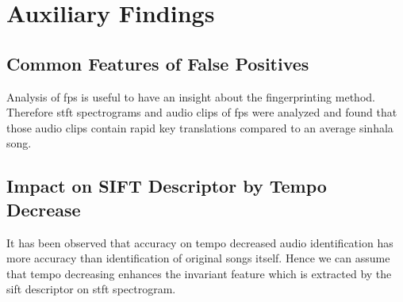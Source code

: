 \section{Auxiliary Findings}

\subsection{Common Features of False Positives}

Analysis of \ac{fp}s is useful to have an insight about the fingerprinting method. Therefore \ac{stft}
spectrograms and audio clips of \ac{fp}s were analyzed and found that those audio clips contain
rapid key translations compared to an average sinhala song. 

\subsection{Impact on SIFT Descriptor by Tempo Decrease}

It has been observed that accuracy on tempo decreased audio identification has more accuracy than
identification of original songs itself. Hence we can assume that tempo decreasing enhances the invariant
feature which is extracted by the \ac{sift} descriptor on \ac{stft} spectrogram.   